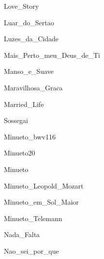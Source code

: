 \documentclass{scrartcl}
\begin{document}

{Love_Story}


{Luar_do_Sertao}


{Luzes_da_Cidade}


{Mais_Perto_meu_Deus_de_Ti}


{Manso_e_Suave}


{Maravilhosa_Graca}


{Married_Life}


{Sossegai}


{Minueto_bwv116}


{Minueto20}


{Minueto}


{Minueto_Leopold_Mozart}


{Minueto_em_Sol_Maior}


{Minueto_Telemann}


{Nada_Falta}


{Nao_sei_por_que}
\end{document}
